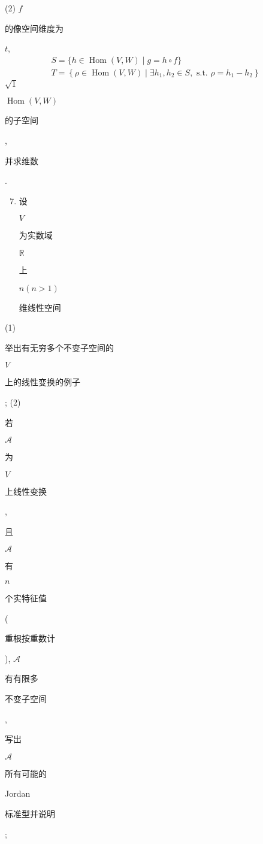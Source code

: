 \documentclass[10pt]{article}
\begin{document}
(2) $f$ \begin{CJK}{UTF8}{mj}的像空间维度为\end{CJK} $t$,
$$
\begin{gathered}
S=\{h \in \operatorname{Hom}(V, W) \mid g=h \circ f\} \\
T=\left\{\rho \in \operatorname{Hom}(V, W) \mid \exists h_{1}, h_{2} \in S, \text { s.t. } \rho=h_{1}-h_{2}\right\}
\end{gathered}
$$
$\sqrt{1}$

$\operatorname{Hom}(V, W)$ \begin{CJK}{UTF8}{mj}的子空间\end{CJK}, \begin{CJK}{UTF8}{mj}并求维数\end{CJK}.

\begin{enumerate}
  \setcounter{enumi}{6}
  \item \begin{CJK}{UTF8}{mj}设\end{CJK} $V$ \begin{CJK}{UTF8}{mj}为实数域\end{CJK} $\mathbb{R}$ \begin{CJK}{UTF8}{mj}上\end{CJK} $n(n>1)$ \begin{CJK}{UTF8}{mj}维线性空间\end{CJK}
\end{enumerate}
(1) \begin{CJK}{UTF8}{mj}举出有无穷多个不变子空间的\end{CJK} $V$ \begin{CJK}{UTF8}{mj}上的线性变换的例子\end{CJK}; (2) \begin{CJK}{UTF8}{mj}若\end{CJK} $\mathscr{A}$ \begin{CJK}{UTF8}{mj}为\end{CJK} $V$ \begin{CJK}{UTF8}{mj}上线性变换\end{CJK}, \begin{CJK}{UTF8}{mj}且\end{CJK} $\mathscr{A}$ \begin{CJK}{UTF8}{mj}有\end{CJK} $n$ \begin{CJK}{UTF8}{mj}个实特征值\end{CJK} (\begin{CJK}{UTF8}{mj}重根按重数计\end{CJK}), $\mathscr{A}$ \begin{CJK}{UTF8}{mj}有有限多\end{CJK} \begin{CJK}{UTF8}{mj}不变子空间\end{CJK}, \begin{CJK}{UTF8}{mj}写出\end{CJK} $\mathscr{A}$ \begin{CJK}{UTF8}{mj}所有可能的\end{CJK} Jordan \begin{CJK}{UTF8}{mj}标准型并说明\end{CJK};
\end{document}
